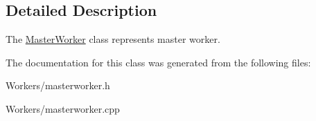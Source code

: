 \subsection{Detailed Description}
The \hyperlink{class_game_1_1_master_worker}{Master\-Worker} class represents master worker. 

The documentation for this class was generated from the following files\-:\begin{DoxyCompactItemize}
\item 
Workers/masterworker.\-h\item 
Workers/masterworker.\-cpp\end{DoxyCompactItemize}
